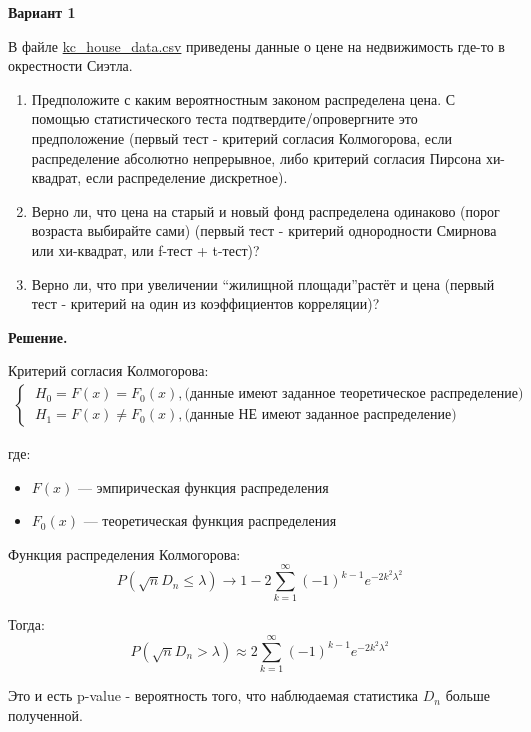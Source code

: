 \documentclass[12pt]{article}
\begin{document}
	\textbf{Вариант 1}
	
	В файле \href{https://drive.google.com/file/d/1cx0pshptDSVmaWLJCBGS9jIIJ2g-VRgT/view}{kc\_house\_data.csv} приведены данные о цене на недвижимость где-то в окрестности Сиэтла.
	
	\begin{enumerate}
		\item Предположите с каким вероятностным законом распределена цена. С помощью статистического теста подтвердите/опровергните это предположение (первый тест - критерий согласия Колмогорова, если распределение абсолютно непрерывное, либо критерий согласия Пирсона хи-квадрат, если распределение дискретное).
		
		\item Верно ли, что цена на старый и новый фонд распределена одинаково (порог возраста выбирайте сами) (первый тест - критерий однородности Смирнова или хи-квадрат, или f-тест + t-тест)?
		
		\item Верно ли, что при увеличении \textquotedblleft жилищной площади\textquotedblright 	растёт и цена (первый тест - критерий на один из коэффициентов корреляции)?
	\end{enumerate}
	
	\textbf{Решение.}
	
	Критерий согласия Колмогорова:
	\begin{gather*}
		\begin{cases}
			\ H_0 = F(x) = F_0(x), \text{(данные имеют заданное теоретическое распределение)} \\
			\ H_1 = F(x) \ne F_0(x), \text{(данные НЕ имеют заданное распределение)} \
		\end{cases}
	\end{gather*}
	
	где:
	\begin{itemize}
		\item $ F(x) $ — эмпирическая функция распределения
		\item $ F_0(x) $ — теоретическая функция распределения
	\end{itemize}
	
	Функция распределения Колмогорова: $$ P(\sqrt{n} D_n \le \lambda) \to 1 - 2 \sum_{k=1}^{\infty} (-1)^{k-1} e^{-2k^2 \lambda^2} $$
	
	Тогда: $$ P(\sqrt{n} D_n > \lambda) \approx 2 \sum_{k=1}^{\infty} (-1)^{k-1} e^{-2k^2 \lambda^2} $$
	
	Это и есть p-value - вероятность того, что наблюдаемая статистика $ D_n $ больше полученной.
	\newpage
	
\end{document}
